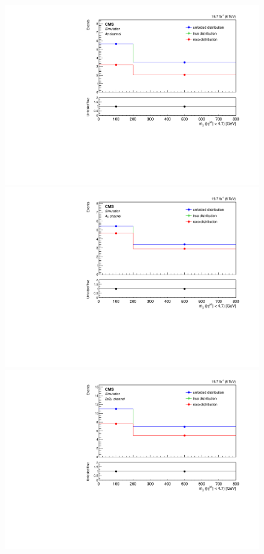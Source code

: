 \begin{figure}[hbtp]
  \begin{center}
    \includegraphics[width=0.8\cmsFigWidth]{Figures/Unfolding/MCTests/Mjj_ZZTo4e_MadMatrix_MadDistr_FullSample_fr}     
    \includegraphics[width=0.8\cmsFigWidth]{Figures/Unfolding/MCTests/Mjj_ZZTo4m_MadMatrix_MadDistr_FullSample_fr}     
    \includegraphics[width=0.8\cmsFigWidth]{Figures/Unfolding/MCTests/Mjj_ZZTo2e2m_MadMatrix_MadDistr_FullSample_fr}

\end{center}
\end{figure}
